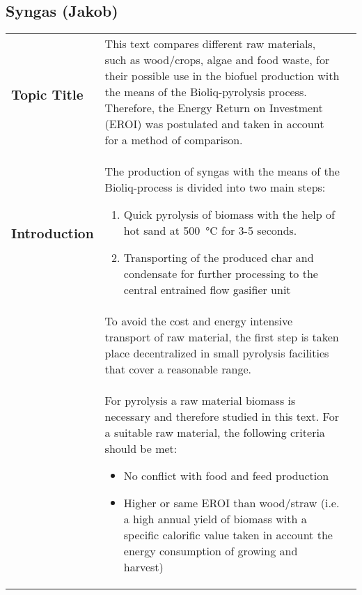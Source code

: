  \subsection{Syngas (Jakob)}
 
 \begin{xtabular}{|p{3.8cm}|p{8.3cm}|p{4.2cm}|}
 	\vspace*{-1.25\baselineskip}\subsubsection{Topic Title}
 	& 
 	This text compares different raw materials, such as wood/crops, algae and food waste, for their possible use in the biofuel production with the means of the Bioliq-pyrolysis process. Therefore, the Energy Return on Investment (EROI) was postulated and taken in account for a method of comparison.
 	& 
 	\\
 	\vspace*{-1.25\baselineskip}\subsubsection{Introduction}
 	& 
 	The production of syngas with the means of the Bioliq-process is divided into two main steps:
 	\begin{enumerate}
 		\item Quick pyrolysis of biomass with the help of hot sand at \SI{500}{\degreeCelsius} for 3-5 seconds.
 		\item Transporting of the produced char and condensate for further processing to the central entrained flow gasifier unit
 	\end{enumerate}
 	&
 	\\
 	
 	&
 	To avoid the cost and energy intensive transport of raw material, the first step is taken place decentralized in small pyrolysis facilities that cover a reasonable range.
 	&
 	
 	\\
 	
 	&
 	For pyrolysis a raw material biomass is necessary and therefore studied in this text. For a suitable raw material, the following criteria should be met:
 	\begin{itemize}
 		\item No conflict with food and feed production
 		\item Higher or same EROI than wood/straw (i.e. a high annual yield of biomass with a specific calorific value taken in account the energy consumption of growing and harvest)
 	\end{itemize}
 	&
 	

\end{xtabular}
